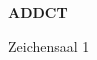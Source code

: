 \documentclass[a4paper]{article}
\begin{document}
\printGenericVSLHeader
\begin{center}
\begin{vsltext}{3cm}{4cm}

   \vspace{0.5cm} 

    \textbf{ADDCT} 

    \vspace{1.5cm}

    Zeichensaal 1

\end{vsltext}

\end{center}
\end{document}
